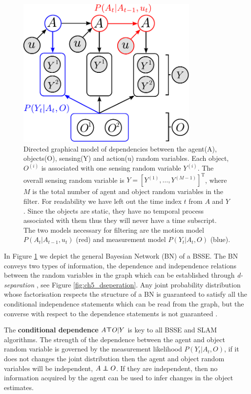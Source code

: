 \begin{figure}
\centering
\includegraphics[width=0.8\textwidth]{./ch5-MLMF/Figures/Figure2.pdf}
\caption{Directed graphical model of dependencies between the agent(A), objects(O), sensing(Y) and action(u) random variables. Each 
object, $O^{(i)}$ is associated with one sensing random variable $Y^{(i)}$. The overall sensing random variable is $Y = \left[Y^{(1)},\dots,Y^{(M-1)}\right]^{\mathrm{T}}$,
where $M$ is the total number of agent and object random variables in the filter. 
For readability we have left out the time index $t$ from $A$ and $Y$. Since the objects are static, they have no temporal process associated with 
them thus they will never have a time subscript. The two models necessary for filtering are the motion model $P(A_t|A_{t-1},u_t)$ (red) and measurement model
$P(Y_t|A_t,O)$ (blue).}
\label{fig:bayesian_sse_dag}
\end{figure}

In Figure \ref{fig:bayesian_sse_dag} we depict the general Bayesian Network (BN) of a BSSE. The BN conveys two types of
information, the dependence and independence relations between the random variables in the graph which can be established
through \textit{d-separation} \cite{BayesBall}, see Figure \ref{fig:ch5_dseperation}. Any joint probability distribution 
whose factorisation  respects the structure of a BN is guaranteed to satisfy all the conditional independence 
statements which can be read from the graph, but the converse with respect to the dependence statements is 
not guaranteed \cite[p.43]{barberBRML2012}. 

The \textbf{conditional dependence} $A \dependent O | Y$ is key to all BSSE and SLAM algorithms. The strength of the dependence 
between the agent and object random variable is governed by the measurement likelihood $P(Y_t|A_t,O)$, if it does not changes the 
joint distribution then the agent and object random variables will be independent, $A \independent O$. If they are independent, 
then no information acquired by the agent can be used to infer changes in the object estimates.

